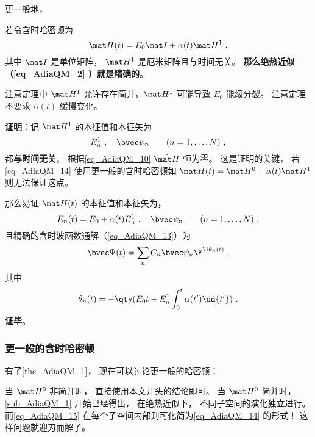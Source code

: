 更一般地，
\begin{theorem}{}\label{the_AdiaQM_1}
若令含时哈密顿为
\begin{equation}\label{eq_AdiaQM_14}
\mat H(t) = E_0\mat I + \alpha(t) \mat H^1~,
\end{equation}
其中 $\mat I$ 是单位矩阵， $\mat H^1$ 是厄米矩阵且与时间无关。 \textbf{那么绝热近似（\autoref{eq_AdiaQM_2} ）就是精确的}。
\end{theorem}
注意定理中 $\mat H^1$ 允许存在简并，$\mat H^1$ 可能导致 $E_0$ 能级分裂。 注意定理不要求 $\alpha(t)$ 缓慢变化。

\textbf{证明}：记 $\mat H^1$ 的本征值和本征矢为
\begin{equation}
E_n^1~, \quad \bvec\psi_n \qquad (n=1,\dots,N)~,
\end{equation}
都\textbf{与时间无关}， 根据\autoref{eq_AdiaQM_10} $\tilde{\mat H}$ 恒为零。 这是证明的关键， 若\autoref{eq_AdiaQM_14} 使用更一般的含时哈密顿如 $\mat H(t) = \mat H^0 + \alpha(t) \mat H^1$ 则无法保证这点。

那么易证 $\mat H(t)$ 的本征值和本征矢为，
\begin{equation}
E_n(t) = E_0 + \alpha(t) E_n^1~, \quad \bvec\psi_n \qquad (n=1,\dots,N)~,
\end{equation}
且精确的含时波函数通解（\autoref{eq_AdiaQM_13}）为
\begin{equation}
\bvec \Psi(t) = \sum_n C_n \bvec\psi_n \E^{\I\theta_n(t)}~.
\end{equation}
其中
\begin{equation}
\theta_n(t) = -\qty(E_0 t + E_n^1 \int_0^t\alpha(t')\dd{t'})~.
\end{equation}
\textbf{证毕}。

\subsubsection{更一般的含时哈密顿}
有了\autoref{the_AdiaQM_1}， 现在可以讨论更一般的哈密顿：


当 $\mat H^0$ 非简并时， 直接使用本文开头的结论即可。 当 $\mat H^0$ 简并时， \autoref{sub_AdiaQM_1} 开始已经得出， 在绝热近似下， 不同子空间的演化独立进行。 而\autoref{eq_AdiaQM_15} 在每个子空间内部则可化简为\autoref{eq_AdiaQM_14} 的形式！ 这样问题就迎刃而解了。

